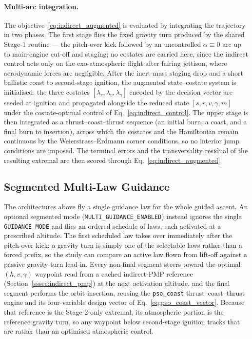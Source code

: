 \paragraph{Multi-arc integration.}
The objective~\eqref{eq:indirect_augmented} is evaluated by integrating the
trajectory in two phases. The first stage flies the fixed gravity turn produced by
the shared Stage-1 routine --- the pitch-over kick followed by an uncontrolled
$\alpha\equiv0$ arc up to main-engine cut-off and staging; no costates are carried
here, since the indirect control acts only on the exo-atmospheric flight after
fairing jettison, where aerodynamic forces are negligible. After the inert-mass
staging drop and a short ballistic coast to second-stage ignition, the augmented
state--costate system is initialised: the three costates
$[\lambda_r,\lambda_v,\lambda_\gamma]$ encoded by the decision vector are seeded at
ignition and propagated alongside the reduced state $[s,r,v,\gamma,m]$ under the
costate-optimal control of Eq.~\eqref{eq:indirect_control}. The upper stage is then
integrated as a thrust--coast--thrust sequence (an initial burn, a coast, and a
final burn to insertion), across which the costates and the Hamiltonian remain
continuous by the Weierstrass--Erdmann corner conditions, so no interior jump
conditions are imposed. The terminal errors and the transversality residual of the
resulting extremal are then scored through Eq.~\eqref{eq:indirect_augmented}.

\subsection{Segmented Multi-Law Guidance}
\label{ssec:segmented}

The architectures above fly a single guidance law for the whole guided ascent. An
optional segmented mode (\texttt{MULTI\_GUIDANCE\_ENABLED}) instead ignores the
single \texttt{GUIDANCE\_MODE} and flies an ordered schedule of laws, each activated
at a prescribed altitude. The first scheduled law takes over immediately after the
pitch-over kick; a gravity turn is simply one of the selectable laws rather than a
forced prefix, so the study can compare an active law flown from lift-off against a
passive gravity-turn lead-in. Every non-final segment steers toward the optimal
$(h,v,\gamma)$ waypoint read from a cached indirect-PMP reference
(Section~\ref{sssec:indirect_pmp}) at the next activation altitude, and the final
segment performs the orbit insertion, reusing the \texttt{pso\_coast}
thrust--coast--thrust engine and its four-variable design vector of
Eq.~\eqref{eq:pso_coast_vector}. Because that reference is the Stage-2-only
extremal, its atmospheric portion is the reference gravity turn, so any waypoint
below second-stage ignition tracks that arc rather than an optimised atmospheric
control.

